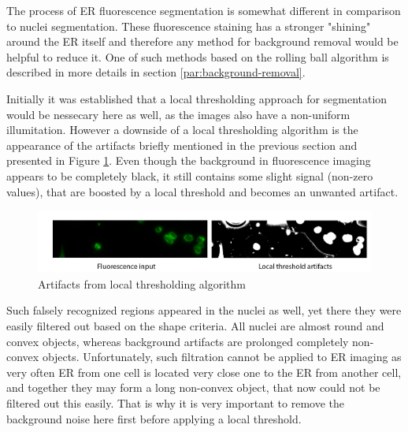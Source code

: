 The process of ER fluorescence segmentation is somewhat different in comparison to nuclei segmentation. These fluorescence staining has a stronger "shining" around the ER itself and therefore any method for background removal would be helpful to reduce it. One of such methods based on the rolling ball algorithm is described in more details in section \ref{par:background-removal}.

Initially it was established that a local thresholding approach for segmentation would be nessecary here as well, as the images also have a non-uniform illumitation. However a downside of a local thresholding algorithm is the appearance of the artifacts briefly mentioned in the previous section and presented in Figure \ref{fig:artifacts-er}. Even though the background in fluorescence imaging appears to be completely black, it still contains some slight signal (non-zero values), that are boosted by a local threshold and becomes an unwanted artifact. 
\begin{figure}[H]
	\begin{center}
		\includegraphics[width=\linewidth]{bilder/ER/artifacts.png}
		\caption{Artifacts from local thresholding algorithm}\label{fig:artifacts-er}
	\end{center}
\end{figure}
Such falsely recognized regions appeared in the nuclei as well, yet there they were easily filtered out based on the shape criteria. All nuclei are almost round and convex objects, whereas background artifacts are prolonged completely non-convex objects. Unfortunately, such filtration cannot be applied to ER imaging as very often ER from one cell is located very close one to the ER from another cell, and together they may form a long non-convex object, that now could not be filtered out this easily. That is why it is very important to remove the background noise here first before applying a local threshold.

